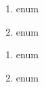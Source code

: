 \begin{enumerate}
	\item enum
	\item	enum
\end{enumerate}

\begin{enumerate}
	\item enum
	\item	enum
\end{enumerate}


